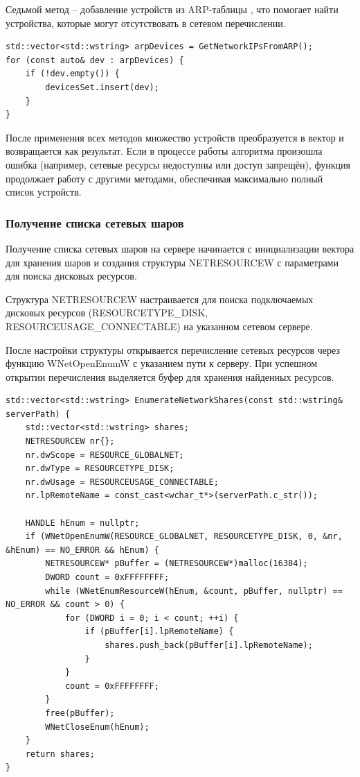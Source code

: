 Седьмой метод -- добавление устройств из ARP-таблицы \cite{iphlpapiDOC}, что помогает найти устройства, которые могут отсутствовать в сетевом перечислении.

\begin{lstlisting}[style=CodeListing]
std::vector<std::wstring> arpDevices = GetNetworkIPsFromARP();
for (const auto& dev : arpDevices) {
    if (!dev.empty()) {
        devicesSet.insert(dev);
    }
}
\end{lstlisting}

После применения всех методов множество устройств преобразуется в вектор и возвращается как результат. Если в процессе работы алгоритма произошла ошибка (например, сетевые ресурсы недоступны или доступ запрещён), функция продолжает работу с другими методами, обеспечивая максимально полный список устройств.

\subsubsection{Получение списка сетевых шаров}

Получение списка сетевых шаров на сервере начинается с инициализации вектора для хранения шаров и создания структуры NETRESOURCEW с параметрами для поиска дисковых ресурсов.

Структура NETRESOURCEW настраивается для поиска подключаемых дисковых ресурсов (RESOURCETYPE\_DISK, RESOURCEUSAGE\_CONNECTABLE) на указанном сетевом сервере.

После настройки структуры открывается перечисление сетевых ресурсов через функцию WNetOpenEnumW с указанием пути к серверу. При успешном открытии перечисления выделяется буфер для хранения найденных ресурсов.

\begin{lstlisting}[style=CodeListing]
std::vector<std::wstring> EnumerateNetworkShares(const std::wstring& serverPath) {
    std::vector<std::wstring> shares;
    NETRESOURCEW nr{};
    nr.dwScope = RESOURCE_GLOBALNET;
    nr.dwType = RESOURCETYPE_DISK;
    nr.dwUsage = RESOURCEUSAGE_CONNECTABLE;
    nr.lpRemoteName = const_cast<wchar_t*>(serverPath.c_str());
    
    HANDLE hEnum = nullptr;
    if (WNetOpenEnumW(RESOURCE_GLOBALNET, RESOURCETYPE_DISK, 0, &nr, &hEnum) == NO_ERROR && hEnum) {
        NETRESOURCEW* pBuffer = (NETRESOURCEW*)malloc(16384);
        DWORD count = 0xFFFFFFFF;
        while (WNetEnumResourceW(hEnum, &count, pBuffer, nullptr) == NO_ERROR && count > 0) {
            for (DWORD i = 0; i < count; ++i) {
                if (pBuffer[i].lpRemoteName) {
                    shares.push_back(pBuffer[i].lpRemoteName);
                }
            }
            count = 0xFFFFFFFF;
        }
        free(pBuffer);
        WNetCloseEnum(hEnum);
    }
    return shares;
}
\end{lstlisting}


